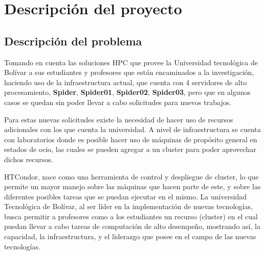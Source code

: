
\chapter{Descripción del proyecto} %

\label{Chapter1} %


\newcommand{\keyword}[1]{\textbf{#1}}
\newcommand{\tabhead}[1]{\textbf{#1}}
\newcommand{\code}[1]{\texttt{#1}}
\newcommand{\file}[1]{\texttt{\bfseries#1}}
\newcommand{\option}[1]{\texttt{\itshape#1}}


\section{Descripción del problema}
Tomando en cuenta las soluciones HPC que provee la Universidad tecnológica de Bolívar a sus estudiantes y profesores que están encaminados a la investigación, haciendo uso de la infraestructura actual, que cuenta con 4 servidores de alto procesamiento, \textbf{Spider}, \textbf{Spider01}, \textbf{Spider02}, \textbf{Spider03}, pero que en algunos casos se quedan sin poder llevar a cabo solicitudes para nuevos trabajos.

Para estas nuevas solicitudes existe la necesidad de hacer uso de recursos adicionales con los que cuenta la universidad. A nivel de infraestructura se cuenta con laboratorios donde es posible hacer uso de máquinas de propósito general en estados de ocio, las cuales se pueden agregar a un cluster para poder aprovechar dichos recursos. 

HTCondor, nace como una herramienta de control y despliegue de cluster, lo que permite un mayor manejo sobre las máquinas que hacen parte de este, y sobre las diferentes posibles tareas que se puedan ejecutar en el mismo. La universidad Tecnológica de Bolívar, al ser líder en la implementación de nuevas tecnologías, busca permitir a profesores como a los estudiantes un recurso (cluster) en el cual puedan llevar a cabo tareas de computación de alto desempeño, mostrando así, la capacidad, la infraestructura, y el liderazgo que posee en el campo de las nuevas tecnologías.\\

